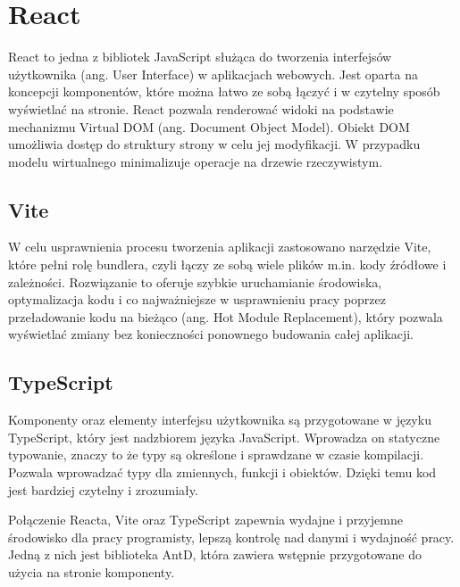 \section{React}
React to jedna z bibliotek JavaScript służąca do tworzenia interfejsów użytkownika (ang. User Interface) w aplikacjach webowych. Jest oparta na koncepcji komponentów, które można łatwo ze sobą łączyć i w czytelny sposób wyświetlać na stronie. React pozwala renderować widoki na podstawie mechanizmu Virtual DOM (ang. Document Object Model). Obiekt DOM umożliwia dostęp do struktury strony w celu jej modyfikacji. W przypadku modelu wirtualnego minimalizuje operacje na drzewie rzeczywistym. 
\subsection*{Vite}
W celu usprawnienia procesu tworzenia aplikacji zastosowano narzędzie Vite, które pełni rolę bundlera, czyli łączy ze sobą wiele plików m.in. kody źródłowe i zależności. Rozwiązanie to oferuje szybkie uruchamianie środowiska, optymalizacja kodu i co najważniejsze w usprawnieniu pracy poprzez przeładowanie kodu na bieżąco (ang. Hot Module Replacement), który pozwala wyświetlać zmiany bez konieczności ponownego budowania całej aplikacji. 
\subsection*{TypeScript}
Komponenty oraz elementy interfejsu użytkownika są przygotowane w języku TypeScript, który jest nadzbiorem języka JavaScript. Wprowadza on statyczne typowanie, znaczy to że typy są określone i sprawdzane w czasie kompilacji. Pozwala wprowadzać typy dla zmiennych, funkcji i obiektów. Dzięki temu kod jest bardziej czytelny i zrozumiały. 
\newline

Połączenie Reacta, Vite oraz TypeScript zapewnia wydajne i przyjemne środowisko dla pracy programisty, lepszą kontrolę nad danymi i wydajność pracy. Jedną z nich jest biblioteka AntD, która zawiera wstępnie przygotowane do użycia na stronie komponenty. 

